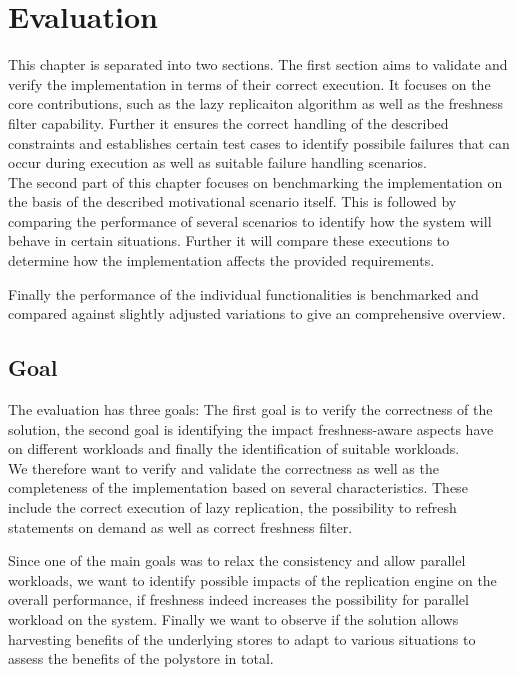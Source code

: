 \chapter{Evaluation}
\label{c:evaluation}

This chapter is separated into two sections. The first section aims to validate and verify the implementation in terms of their
correct execution. It focuses on the core contributions, such as the lazy replicaiton algorithm as well as the freshness filter capability.
Further it ensures the correct handling of the described constraints and establishes certain test cases to identify possibile failures that can occur 
during execution as well as suitable failure handling scenarios.\\

The second part of this chapter focuses on benchmarking the implementation on the basis of the described motivational scenario itself.
This is followed by comparing the performance of several scenarios to identify how the system will behave in certain situations.
Further it will compare these executions to determine how the implementation affects the provided requirements.

Finally the performance of the individual functionalities is benchmarked and compared against slightly adjusted variations 
to give an comprehensive overview.


\section{Goal}
The evaluation has three goals: The first goal is to verify the correctness of the solution, the second goal
is identifying the impact freshness-aware aspects have on different workloads and finally the identification of suitable workloads.\\

We therefore want to verify and validate the correctness as well as the completeness of the implementation based on several characteristics.
These include the correct execution of lazy replication, the possibility to refresh statements on demand as well as correct freshness filter.

Since one of the main goals was to relax the consistency and allow parallel workloads,
we want to identify possible impacts of the replication engine on the overall performance, if freshness indeed increases the possibility
for parallel workload on the system.
Finally we want to observe if the solution allows harvesting benefits of the underlying stores to adapt to various situations
to assess the benefits of the polystore in total.\\

